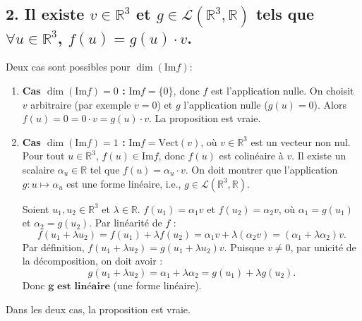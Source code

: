 \documentclass[french]{yLectureNote}
\begin{document}
\subsection*{2. Il existe $v \in \mathbb{R}^3$ et $g \in \mathcal{L}(\mathbb{R}^3, \mathbb{R})$ tels que $\forall u \in \mathbb{R}^3$, $f(u) = g(u) \cdot v$.}
Deux cas sont possibles pour $\dim(\mathrm{Im}f)$:
\begin{enumerate}
    \item \textbf{Cas $\dim(\mathrm{Im}f) = 0$ : } $\mathrm{Im}f = \{0\}$, donc $f$ est l'application nulle.
    On choisit $v$ arbitraire (par exemple $v=0$) et $g$ l'application nulle ($g(u)=0$).
    Alors $f(u) = 0 = 0 \cdot v = g(u) \cdot v$. La proposition est vraie.

    \item \textbf{Cas $\dim(\mathrm{Im}f) = 1$ : } $\mathrm{Im}f = \mathrm{Vect}(v)$, où $v \in \mathbb{R}^3$ est un vecteur non nul.
    Pour tout $u \in \mathbb{R}^3$, $f(u) \in \mathrm{Im}f$, donc $f(u)$ est colinéaire à $v$.
    Il existe un scalaire $\alpha_u \in \mathbb{R}$ tel que $f(u) = \alpha_u \cdot v$.
    On doit montrer que l'application $g: u \mapsto \alpha_u$ est une forme linéaire, i.e., $g \in \mathcal{L}(\mathbb{R}^3, \mathbb{R})$.

    Soient $u_1, u_2 \in \mathbb{R}^3$ et $\lambda \in \mathbb{R}$.
    $f(u_1) = \alpha_1 v$ et $f(u_2) = \alpha_2 v$, où $\alpha_1=g(u_1)$ et $\alpha_2=g(u_2)$.
    Par linéarité de $f$ :
    $$f(u_1 + \lambda u_2) = f(u_1) + \lambda f(u_2) = \alpha_1 v + \lambda (\alpha_2 v) = (\alpha_1 + \lambda \alpha_2) v.$$
    Par définition, $f(u_1 + \lambda u_2) = g(u_1 + \lambda u_2) v$.
    Puisque $v \ne 0$, par unicité de la décomposition, on doit avoir :
    $$g(u_1 + \lambda u_2) = \alpha_1 + \lambda \alpha_2 = g(u_1) + \lambda g(u_2).$$
    Donc $\mathbf{g \text{ est linéaire}}$ (une forme linéaire).
\end{enumerate}
Dans les deux cas, la proposition est vraie.
\end{document}
